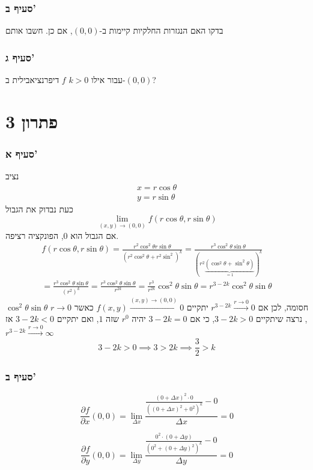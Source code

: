 \documentclass[12pt, titlepage]{article}
\begin{document}
\section*{סעיף ב'}
בדקו האם הנגזרות החלקיות קיימות ב-$\left(0,0\right)$, אם כן. חשבו אותם
\section*{סעיף ג'}
עבור אילו $k>0$ $f$ דיפרנציאבילית ב-$\left(0,0\right)$?
\part*{פתרון 3}
\section*{סעיף א'}
נציב
\begin{gather*}
    x = r \cos \theta \\
    y = r \sin \theta
\end{gather*}
כעת נבדוק את הגבול
\[
    \lim_{\left(x,y\right) \to \left(0,0\right)} f\left(r\cos \theta,r\sin\theta\right)
\]
אם הגבול הוא $0$, הפונקציה רציפה.
\begin{gather*}
    f\left(r\cos \theta, r\sin\theta\right) = \frac{r^2 \cos^2\theta r\sin\theta}{\left(r^2\cos^2\theta+r^2\sin^2\right)^k} = \frac{r^3 \cos^2\theta \sin\theta}{\left(r^2\underbrace{\left(\cos^2\theta+\sin^2\theta\right)}_{=1}\right)^k}\\
    =\frac{r^3 \cos^2\theta \sin\theta}{\left(r^2\right)^k} = \frac{r^3 \cos^2\theta \sin\theta}{r^{2k}} = \frac{r^3}{r^{2k}} \cos^2\theta\sin\theta=r^{3-2k} \cos^2\theta\sin\theta
\end{gather*}
$\cos^2\theta\sin\theta$ חסומה, לכן אם $r^{3-2k}\xrightarrow{r\to0}0$ יתקיים $f\left(x,y\right)\xrightarrow{\left(x,y\right)\to\left(0,0\right)}0$
כאשר $r\to 0$, נרצה שיתקיים $3-2k>0$, כי אם $3-2k=0$  יהיה $r^0$ שזה $1$, ואם יתקיים $3-2k<0$ אז $r^{3-2k}\xrightarrow{r\to0}\infty$
\[
3-2k > 0 \implies 3 > 2k \implies \boxed{\frac{3}{2} > k}
\]
\section*{סעיף ב'}
\[
    \frac{\partial f}{\partial x} \left(0,0\right) = \lim_{\Delta x} \frac{\frac{\left(0+\Delta x\right)^2 \cdot 0}{\left(\left(0+\Delta x\right)^2 + 0^2\right)^k} - 0}{\Delta x} = 0
\]

\[
    \frac{\partial f}{\partial y} \left(0,0\right) = \lim_{\Delta y} \frac{\frac{0^2 \cdot \left(0+\Delta y\right)}{\left(0^2 + \left(0+\Delta y\right)^2\right)^k} - 0}{\Delta y} = 0
\]
\end{document}
